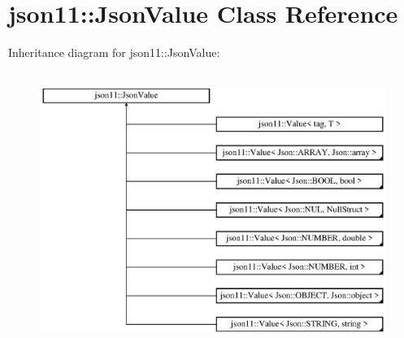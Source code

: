\hypertarget{classjson11_1_1_json_value}{}\section{json11\+:\+:Json\+Value Class Reference}
\label{classjson11_1_1_json_value}
Inheritance diagram for json11\+:\+:Json\+Value\+:\begin{figure}[H]
\begin{center}
\leavevmode
\includegraphics[height=9.000000cm]{classjson11_1_1_json_value}
\end{center}
\end{figure}
